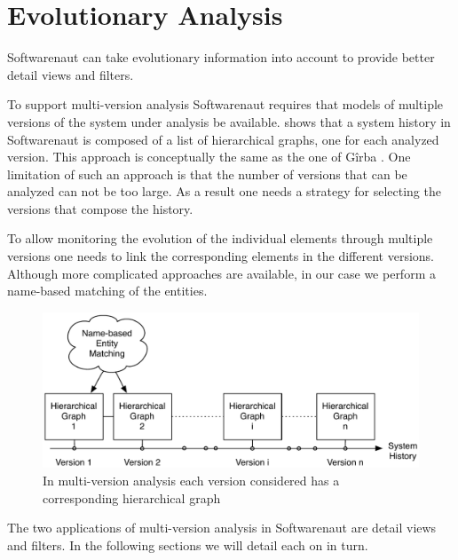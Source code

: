 \documentclass[preprint,12pt]{elsarticle}
\begin{document}
\newpage
\section {Evolutionary Analysis}
\label{sec:evol}

Softwarenaut can take evolutionary information into account to provide better detail views and filters.

To support multi-version analysis Softwarenaut requires that models of multiple versions of the system under analysis be available.  shows that a system history in Softwarenaut is composed of a list of hierarchical graphs, one for each analyzed version. This approach is conceptually the same as the one of G{\^i}rba \cite{girba-thesis}. One limitation of such an approach is that the number of versions that can be analyzed can not be too large. As a result one needs a strategy for selecting the versions that compose the history.

To allow monitoring the evolution of the individual elements through multiple versions one needs to link the corresponding elements in the different versions. Although more complicated approaches are available, in our case we perform a name-based matching of the entities.

\begin{figure}[h]
\begin{center}
\includegraphics[width=\linewidth]{images/MultiVersionAnalysis}
\caption{In multi-version analysis each version considered has a corresponding hierarchical graph}
\end{center}
\end{figure}

The two applications of multi-version analysis in Softwarenaut are detail views and filters. In the following sections we will detail each on in turn.
\end{document}
